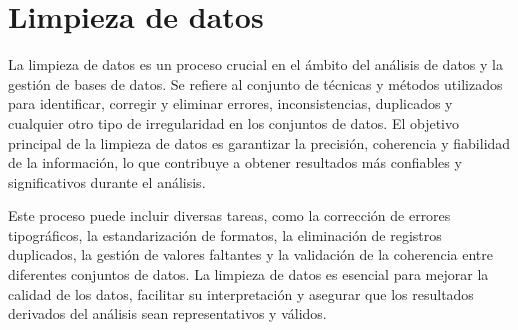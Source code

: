 \section{Limpieza de datos}

La limpieza de datos es un proceso crucial en el ámbito del análisis de datos y la gestión de bases de datos. Se refiere al conjunto de técnicas y métodos utilizados para identificar, corregir y eliminar errores, inconsistencias, duplicados y cualquier otro tipo de irregularidad en los conjuntos de datos. El objetivo principal de la limpieza de datos es garantizar la precisión, coherencia y fiabilidad de la información, lo que contribuye a obtener resultados más confiables y significativos durante el análisis.

Este proceso puede incluir diversas tareas, como la corrección de errores tipográficos, la estandarización de formatos, la eliminación de registros duplicados, la gestión de valores faltantes y la validación de la coherencia entre diferentes conjuntos de datos. La limpieza de datos es esencial para mejorar la calidad de los datos, facilitar su interpretación y asegurar que los resultados derivados del análisis sean representativos y válidos.
